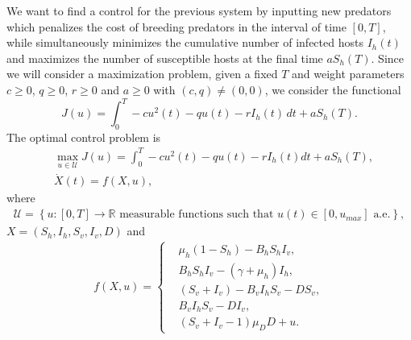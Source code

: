 \documentclass{amsart}
\theoremstyle{definition}
\theoremstyle{remark}
\numberwithin{equation}{section}
\newcommand{\R}{\mathbb R}
\begin{document}
We want to find a control for the previous system by inputting new predators which 
 penalizes the cost of breeding predators in the interval of time $[0,T]$, while simultaneously minimizes the cumulative number of infected hosts $I_h(t)$ and maximizes the number of susceptible hosts at the final time $aS_h(T)$. 
Since we will consider a maximization problem, 
given a fixed $T$ and weight parameters $c\ge 0$, $q\ge 0$, $r\ge0$ and $a\ge 0$ with $(c,q)\neq (0,0)$, we consider the functional
\begin{equation}
J(u) = \int_0^T -c u^2(t)-qu(t)-rI_h(t) \,dt +a S_h(T).
\end{equation}
The optimal control problem is 
\begin{subequations} \label{eq: OC max}
\begin{align} \label{eq: maximo J}
&\max_{u\in \mathcal{U}}J(u)=\int_0^T -c u^2(t)-qu(t)-rI_h(t) dt +a S_h(T),\\
&\dot{X}(t)=f(X,u), \label{eq: ode_control}%
\end{align} 
\end{subequations}
where
\begin{align}
	\label{eq: medibles} 
	{\mathcal U}=\left\{u:[0,T] \to \R \text{ measurable functions such that } u(t)\in [0,u_{max}] \text{ a.e.} \right\},
\end{align} 
 $X=(S_h,I_h,S_v,I_v,D)$ and 
\begin{align}
	f(X,u)= 
	\begin{cases}
&  \mu_h (1-S_h)- B_h S_h I_v,\\
&  B_h S_h I_v - (\gamma+\mu_h) I_h, \\
 &   (S_v+I_v) -B_v I_h S_v  -   D S_v, \\
 &  B_v I_h S_v -  DI_v, \\
 &   (S_v + I_v-1 )\mu_D D + u.
\end{cases}
\end{align}	
\end{document}
